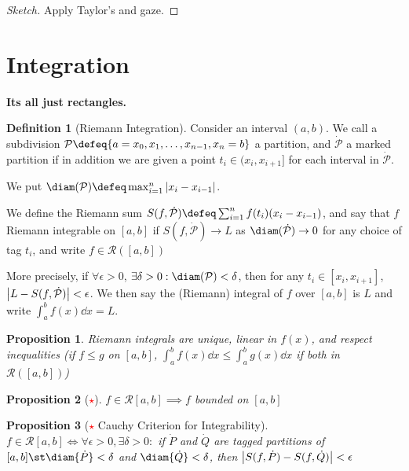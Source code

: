 \documentclass[12pt, oneside]{article}
\newcommand*{\important}{\textcolor{red}{$\star$} }
\theoremstyle{definition}
\newtheorem{defn}{Definition}
\theoremstyle{plain}
\newtheorem{prop}{Proposition}
\theoremstyle{remark}
\let\origsection=\section
\renewcommand\section[1]{\origsection{#1}\label{sec:\thesection}}
\begin{document}
\begin{proof}[Sketch]
  Apply Taylor's and gaze.
\end{proof}

\section{Integration}

\textbf{Its all just rectangles.}
\newcommand{\PP}{\mathcal{P}}
\newcommand{\RR}{\mathcal{R}}

\begin{defn}[Riemann Integration]
  Consider an interval $(a, b)$. We call a subdivision $\PP \defeq \{a = x_0, x_1, \dots, x_{n-1}, x_n = b\}$ a partition, and $\dot{\PP}$ a marked partition if in addition we are given a point $t_i \in (x_i, x_{i+1}]$ for each interval in $\dot{\PP}$.

  We put $\diam(\PP) \defeq \max_{i=1}^n \abs{x_i - x_{i-1}}$.

  We define the Riemann sum $S(f, \dot{\PP}) \defeq \sum_{i=1}^n f(t_i) (x_i - x_{i-1})$, and say that $f$ Riemann integrable on $[a, b]$ if $S(f, \dot{\PP}) \to L$ as $\diam(\dot{\PP}) \to 0$ for any choice of tag $t_i$, and write $f \in \RR([a, b])$

  More precisely, if $\forall \epsilon > 0$, $\exists \delta > 0 : \diam(\PP) < \delta$, then for any $t_i \in [x_i, x_{i+1}]$, $\abs{L - S(f, \dot{\PP})} < \epsilon$. We then say the (Riemann) integral of $f$ over $[a, b]$ is $L$ and write $\int_a^b f(x) \dd{x} = L$.
\end{defn}

\begin{prop}
  Riemann integrals are unique, linear in $f(x)$, and respect inequalities (if $f \leq g$ on $[a, b]$, $\int_a^b f(x) \dd{x} \leq \int_a^b g(x) \dd{x}$ if both in $\RR([a, b])$)
\end{prop}

\begin{prop}[\textcolor{red}{$\star$}]
  $f \in \RR[a, b] \implies f$ bounded on $[a, b]$
\end{prop}

\begin{prop}[\important Cauchy Criterion for Integrability]
  $f \in \mathcal{R}[a, b] \iff \forall \epsilon > 0, \exists \delta > 0 : $ if $\dot{P}$ and $\dot{Q}$ are tagged partitions of $[a, b] \st \diam{\dot{P}} < \delta$ and $\diam{\dot{Q}} < \delta$, then $\abs{S(f, \dot{P}) - S(f, \dot{Q})} < \epsilon$
\end{prop}
\end{document}
